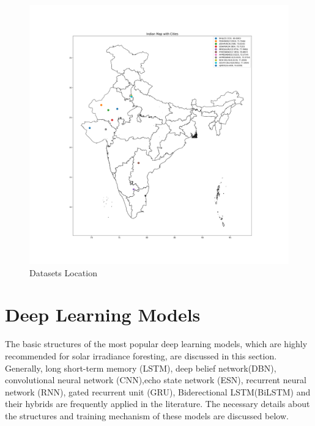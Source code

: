 \documentclass[a4paper,fleqn]{cas-sc}
\begin{document}
  \begin{figure}[!ht]
  \centering
  \includegraphics[width=\textwidth]{AMod India_Map}
  \caption{Datasets Location }
  \label{fig:Data location}
  \end{figure}   






  \section{Deep Learning Models}
  The basic structures of the most popular deep learning models, which are highly recommended for solar irradiance foresting, are discussed in this section. Generally, long short-term memory (LSTM), deep belief network(DBN), convolutional neural network (CNN),echo state network (ESN), recurrent neural network (RNN), gated recurrent unit (GRU), Biderectional LSTM(BiLSTM) and their hybrids are frequently applied in the literature. The necessary details about the structures and training mechanism of these models are discussed below.
  
\end{document}
